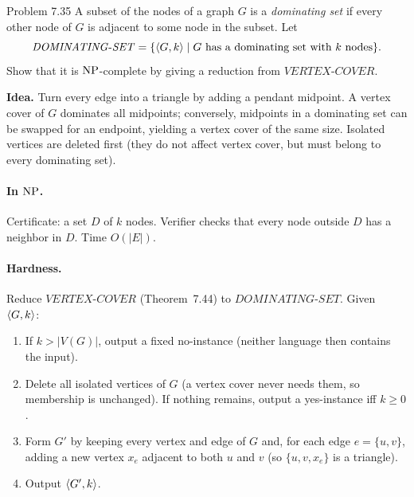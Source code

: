 \begin{question}{Problem 7.35}
A subset of the nodes of a graph $G$ is a \emph{dominating set} if every other node of $G$ is adjacent to some node in the subset. Let
\[
\mathit{DOMINATING\text{-}SET}=\{\langle G,k\rangle\mid G\text{ has a dominating set with $k$ nodes}\}.
\]
Show that it is $\mathrm{NP}$-complete by giving a reduction from $\mathit{VERTEX\text{-}COVER}$.
\end{question}
\begin{soln}
\textbf{Idea.} Turn every edge into a triangle by adding a pendant midpoint. A vertex cover of $G$ dominates all midpoints; conversely, midpoints in a dominating set can be swapped for an endpoint, yielding a vertex cover of the same size. Isolated vertices are deleted first (they do not affect vertex cover, but must belong to every dominating set).

\paragraph{In $\mathrm{NP}$.}
Certificate: a set $D$ of $k$ nodes. Verifier checks that every node outside $D$ has a neighbor in $D$. Time $O(|E|)$.

\paragraph{Hardness.}
Reduce $\mathit{VERTEX\text{-}COVER}$ (Theorem~7.44) to $\mathit{DOMINATING\text{-}SET}$. Given $\langle G,k\rangle$:
\begin{enumerate}
\item If $k>|V(G)|$, output a fixed no-instance (neither language then contains the input).
\item Delete all isolated vertices of $G$ (a vertex cover never needs them, so membership is unchanged). If nothing remains, output a yes-instance iff $k\ge 0$.
\item Form $G'$ by keeping every vertex and edge of $G$ and, for each edge $e=\{u,v\}$, adding a new vertex $x_e$ adjacent to both $u$ and $v$ (so $\{u,v,x_e\}$ is a triangle).
\item Output $\langle G',k\rangle$.
\end{enumerate}

\begin{center}
\end{center}


\end{soln}
